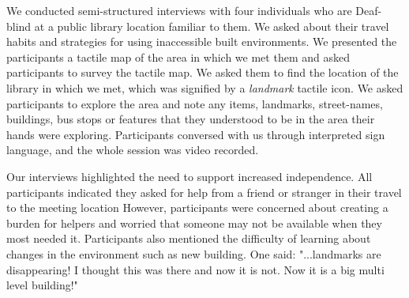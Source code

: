 We conducted semi-structured interviews  with four individuals who are Deaf-blind at a public library location familiar to them. We asked about their travel habits and strategies for using inaccessible built environments.
We presented the participants a tactile map of the area in which we met them and asked participants to survey the tactile map. We asked them to find the location of the library in which we met, which was signified by a \textit{landmark} tactile icon.  We asked participants to explore the area and note any items, landmarks, street-names, buildings, bus stops or features that they understood to be in the area their hands were exploring. %
Participants conversed with us through  interpreted sign language, and the whole session was video recorded. %


Our interviews highlighted the need to support increased independence. All participants indicated they asked for help from a friend or stranger in their travel to the meeting location%
However, participants were concerned about creating a burden for helpers and worried that someone may not be available when they most needed it. 
Participants also mentioned the difficulty of learning about changes in the environment such as new building. One said: %
"...landmarks are disappearing! I thought this was there and now it is not. Now it is a big multi level building!" 

